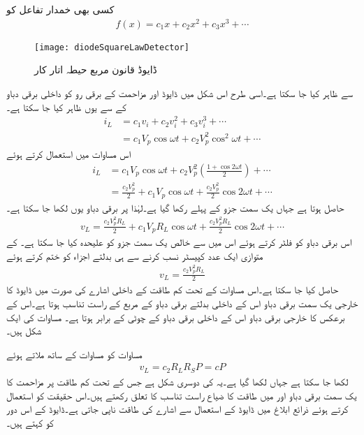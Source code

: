 کسی بھی خمدار تفاعل  کو  
\begin{align*}
f(x)=c_1 x+c_2 x^2+c_3 x^3+\cdots
\end{align*}
%
\begin{figure}
\centering
\texttt{[image: diodeSquareLawDetector]}
\caption{ڈایوڈ قانون مربع حیطہ اتار کار}
\label{شکل_ڈایوڈ_طاقت_کا_ناپ}
\end{figure}
%
سے ظاہر کیا جا سکتا ہے۔اسی طرح اس شکل میں ڈایوڈ اور مزاحمت  کے برقی رو کو داخلی برقی دباو  کے  سے یوں ظاہر کیا جا سکتا ہے۔
\begin{align*}
i_L&=c_1 v_i+c_2 v_i^2+c_3 v_i^3+\cdots \\
&=c_1 V_p \cos \omega t+c_2 V_p^2 \cos^2 \omega t+\cdots
\end{align*}
اس مساوات میں   استعمال کرتے ہوئے
\begin{align*}
i_L&=c_1 V_p \cos \omega t+c_2 V_p^2 \left(\frac{1+\cos 2\omega t}{2} \right)+\cdots\\
&=\frac{c_2 V_p^2}{2}+c_1 V_p \cos \omega t+\frac{c_2 V_p^2}{2} \cos 2 \omega t +\cdots
\end{align*}
حاصل ہوتا ہے جہاں یک سمت جزو کے پہلے رکھا گیا ہے۔لہٰذا  پر برقی دباو  یوں لکھا جا سکتا ہے۔ 
\begin{align*}
v_L=\frac{c_2 V_p^2 R_L}{2}+c_1 V_p R_L \cos \omega t+\frac{c_2 V_p^2 R_L}{2} \cos 2 \omega t +\cdots
\end{align*}
اس برقی دباو کو فلٹر کرتے ہوئے اس میں سے خالص یک سمت جزو کو علیحدہ کیا جا سکتا ہے۔ کے متوازی ایک عدد کپیسٹر نسب کرنے سے  ہی بدلتے اجزاء کو ختم کرتے ہوئے
\begin{align}\label{مساوات_ڈایوڈ_مربع_شناسندہ}
v_L=\frac{c_2 V_p^2 R_L}{2}
\end{align}
حاصل کیا جا سکتا ہے۔اس مساوات کے تحت کم طاقت کے داخلی اشارے کی صورت میں ڈایوڈ کا خارجی یک سمت برقی دباو اس کے داخلی بدلتے برقی دباو کے مربع کے راست تناسب ہوتا ہے۔اس کے برعکس  کا خارجی برقی دباو اس کے داخلی برقی دباو کے چوٹی کے برابر ہوتا ہے۔ مساوات   کی ایک شکل ہیں۔

مساوات  کو مساوات  کے ساتھ ملاتے ہوئے
\begin{align}
v_L=c_2 R_L R_S P = c P 
\end{align}
لکھا جا سکتا ہے جہاں  لکھا گیا ہے۔یہ  کی دوسری شکل ہے جس کے تحت کم طاقت پر مزاحمت  کا یک سمت برقی دباو اور  میں طاقت کا ضیاع راست تناسب کا تعلق رکھتے ہیں۔اس حقیقت کو استعمال کرتے ہوئے ذرائع ابلاغ میں ڈایوڈ کے استعمال سے اشارے کی طاقت ناپی جاتی ہے۔ڈایوڈ کے اس دور کو  کہتے ہیں۔

